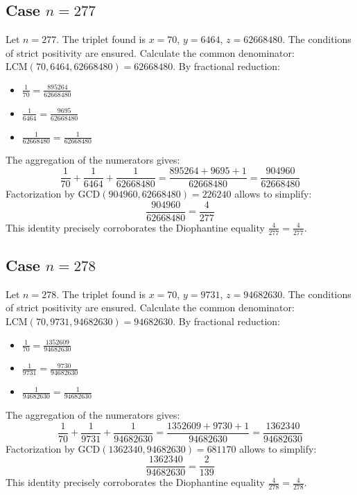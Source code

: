 \documentclass[11pt,a4paper]{article}
\begin{document}
\subsection{Case $n = 277$}
Let $n = 277$. The triplet found is $x = 70$, $y = 6464$, $z = 62668480$.
The conditions of strict positivity are ensured.
Calculate the common denominator: $\text{LCM}(70, 6464, 62668480) = 62668480$.
By fractional reduction:
\begin{itemize}
    \item $\frac{1}{70} = \frac{895264}{62668480}$
    \item $\frac{1}{6464} = \frac{9695}{62668480}$
    \item $\frac{1}{62668480} = \frac{1}{62668480}$
\end{itemize}
The aggregation of the numerators gives:
$$ \frac{1}{70} + \frac{1}{6464} + \frac{1}{62668480} = \frac{895264 + 9695 + 1}{62668480} = \frac{904960}{62668480} $$
Factorization by $\text{GCD}(904960, 62668480) = 226240$ allows to simplify:
$$ \frac{904960}{62668480} = \frac{4}{277} $$
This identity precisely corroborates the Diophantine equality $\frac{4}{277} = \frac{4}{277}$.

\subsection{Case $n = 278$}
Let $n = 278$. The triplet found is $x = 70$, $y = 9731$, $z = 94682630$.
The conditions of strict positivity are ensured.
Calculate the common denominator: $\text{LCM}(70, 9731, 94682630) = 94682630$.
By fractional reduction:
\begin{itemize}
    \item $\frac{1}{70} = \frac{1352609}{94682630}$
    \item $\frac{1}{9731} = \frac{9730}{94682630}$
    \item $\frac{1}{94682630} = \frac{1}{94682630}$
\end{itemize}
The aggregation of the numerators gives:
$$ \frac{1}{70} + \frac{1}{9731} + \frac{1}{94682630} = \frac{1352609 + 9730 + 1}{94682630} = \frac{1362340}{94682630} $$
Factorization by $\text{GCD}(1362340, 94682630) = 681170$ allows to simplify:
$$ \frac{1362340}{94682630} = \frac{2}{139} $$
This identity precisely corroborates the Diophantine equality $\frac{4}{278} = \frac{4}{278}$.
\end{document}
